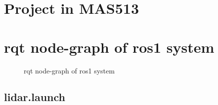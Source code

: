 \appendix

\chapter{Project in MAS513}
\label{Appdix:MAS513}
 

\chapter{rqt node-graph of ros1 system}
\label{Appdix:rqtROS1NB}
\newpage
\begin{figure}[H]

  \caption{rqt node-graph of ros1 system}
  \label{fig:Appdix:rqt:ros1_noBridge}
\end{figure}

\section{lidar.launch}
\label{Appdix:lidar.launch}
\inputminted{xml}{ros_system/launch/src/Refrencesignal.m}
